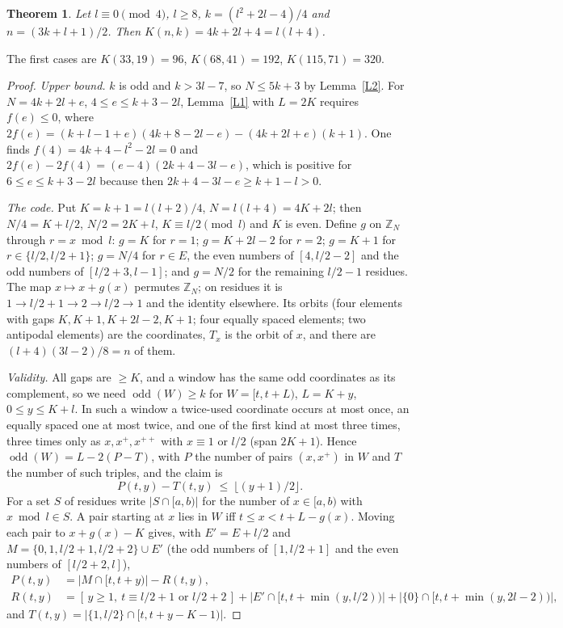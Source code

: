 \documentclass[11pt]{article}
\newtheorem{theorem}{Theorem}
\theoremstyle{remark}
\newcommand{\odd}{\operatorname{odd}}
\begin{document}
\begin{theorem}\label{four}
Let $l\equiv 0\pmod 4$, $l\ge 8$, $k=(l^2+2l-4)/4$ and $n=(3k+l+1)/2$. Then $K(n,k)=4k+2l+4=l(l+4)$.
\end{theorem}
\noindent The first cases are $K(33,19)=96$, $K(68,41)=192$, $K(115,71)=320$.
\begin{proof}
\emph{Upper bound.} $k$ is odd and $k>3l-7$, so $N\le 5k+3$ by Lemma~\ref{L2}. For $N=4k+2l+e$, $4\le e\le k+3-2l$, Lemma~\ref{L1} with
$L=2K$ requires $f(e)\le 0$, where $2f(e)=(k+l-1+e)(4k+8-2l-e)-(4k+2l+e)(k+1)$. One finds $f(4)=4k+4-l^2-2l=0$ and
$2f(e)-2f(4)=(e-4)(2k+4-3l-e)$, which is positive for $6\le e\le k+3-2l$ because then $2k+4-3l-e\ge k+1-l>0$.

\emph{The code.} Put $K=k+1=l(l+2)/4$, $N=l(l+4)=4K+2l$; then $N/4=K+l/2$, $N/2=2K+l$, $K\equiv l/2\pmod l$ and $K$ is even.
Define $g$ on $\mathbb{Z}_N$ through $r=x \bmod l$:
$g=K$ for $r=1$; $g=K+2l-2$ for $r=2$; $g=K+1$ for $r\in\{l/2,l/2+1\}$; $g=N/4$ for $r\in E$, the even numbers of $[4,l/2-2]$ and the
odd numbers of $[l/2+3,l-1]$; and $g=N/2$ for the remaining $l/2-1$ residues. The map $x\mapsto x+g(x)$ permutes $\mathbb{Z}_N$; on residues it is
$1\to l/2+1\to 2\to l/2\to 1$ and the identity elsewhere. Its orbits (four elements with gaps $K,K+1,K+2l-2,K+1$; four equally
spaced elements; two antipodal elements) are the coordinates, $T_x$ is the orbit of $x$, and there are $(l+4)(3l-2)/8=n$ of them.

\emph{Validity.} All gaps are $\ge K$, and a window has the same odd coordinates as its complement, so we need $\odd(W)\ge k$ for
$W=[t,t+L)$, $L=K+y$, $0\le y\le K+l$. In such a window a twice-used coordinate occurs at most once, an equally spaced one at most
twice, and one of the first kind at most three times, three times only as $x,x^+,x^{++}$ with $x\equiv 1$ or $l/2$ (span $2K+1$).
Hence $\odd(W)=L-2(P-T)$, with $P$ the number of pairs $(x,x^+)$ in $W$ and $T$ the number of such triples, and the claim is
\begin{equation}\label{four*} P(t,y)-T(t,y)\ \le\ \lfloor (y+1)/2\rfloor . \end{equation}
For a set $S$ of residues write $|S\cap[a,b)|$ for the number of $x\in[a,b)$ with $x\bmod l\in S$. A pair starting at $x$ lies in $W$
iff $t\le x<t+L-g(x)$. Moving each pair to $x+g(x)-K$ gives, with $E'=E+l/2$ and
$M=\{0,1,l/2+1,l/2+2\}\cup E'$ (the odd numbers of $[1,l/2+1]$ and the even numbers of $[l/2+2,l]$),
\begin{align*} P(t,y)&=|M\cap[t,t+y)|-R(t,y),\\ R(t,y)&=[\,y\ge1,\ t\equiv l/2+1\text{ or }l/2+2\,]+|E'\cap[t,t+\min(y,l/2))|+|\{0\}\cap[t,t+\min(y,2l-2))|, \end{align*}
and $T(t,y)=|\{1,l/2\}\cap[t,t+y-K-1)|$.


\end{proof}
\end{document}
